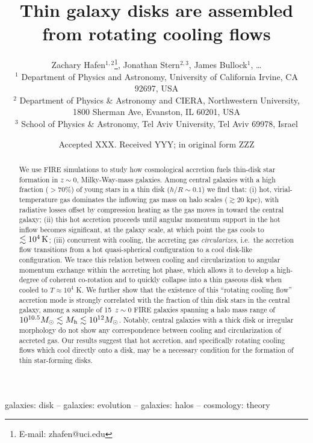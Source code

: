 \documentclass[fleqn,usenatbib]{mnras}
\title[Rotating cooling flows and thin galactic disks]{Thin galaxy disks are assembled from rotating cooling flows}
\author[Hafen, Stern, Bullock et al.]{
Zachary Hafen$^{1,2}$\thanks{E-mail: zhafen@uci.edu},
Jonathan Stern$^{2,3}$,
James Bullock$^{1}$,
\ldots
\\
$^1$ Department of Physics and Astronomy, University of California Irvine, CA 92697, USA
\\
$^2$ Department of Physics \& Astronomy and CIERA, Northwestern University, 1800 Sherman Ave, Evanston, IL 60201, USA \\
$^3$ School of Physics \& Astronomy, Tel Aviv University, Tel Aviv 69978, Israel
}
\date{Accepted XXX. Received YYY; in original form ZZZ}
\newcommand{\Nsample}{15}
\begin{document}
\label{firstpage}
\pagerange{\pageref{firstpage}--\pageref{lastpage}}
\maketitle

\begin{abstract}
We use FIRE simulations to study how cosmological accretion fuels thin-disk star formation in $z\sim 0$, Milky-Way-mass galaxies.
Among central galaxies with a high fraction ($>70\%$) of young stars in a thin disk ($h/R \sim 0.1$) we find that:
(i) hot, virial-temperature gas dominates the inflowing gas mass on halo scales ($\gtrsim 20$ kpc), with radiative losses offset by compression heating as the gas moves in toward the central galaxy;
(ii) this hot accretion proceeds until angular momentum support in the hot inflow becomes significant, at the galaxy scale, at which point the gas cools to $\lesssim10^4\,{\rm K}$; 
(iii) concurrent with cooling, the accreting gas \textit{circularizes}, i.e.\ the accretion flow transitions from a hot quasi-spherical configuration to a cool disk-like configuration. We trace this relation between cooling and circularization to angular momentum exchange within the accreting hot phase, which allows it to develop a high-degree of coherent co-rotation and to quickly collapse into a thin gaseous disk when cooled to $T \approx 10^4$ K.
We further show that the existence of this ``rotating cooling flow'' accretion mode is strongly correlated with the fraction of thin disk stars in the central galaxy, among a sample of \Nsample\ $z\sim0$ FIRE galaxies spanning a halo mass range of $10^{10.5} M_\odot \lesssim M_{\rm h} \lesssim 10^{12} M_\odot$.
Notably, central galaxies with a thick disk or irregular morphology do not show any correspondence between cooling and circularization of accreted gas. 
Our results suggest that hot accretion, and specifically rotating cooling flows which cool directly onto a disk, may be a necessary condition for the formation of thin star-forming disks.
\end{abstract}

\begin{keywords}
galaxies: disk -- galaxies: evolution -- galaxies: halos -- cosmology: theory
\end{keywords}

\end{document}
